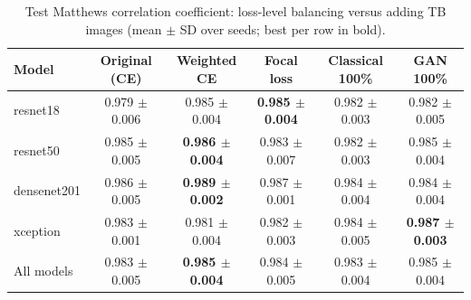 \begin{table}[htbp]
\centering
\caption{Test Matthews correlation coefficient: loss-level balancing versus adding TB images (mean $\pm$ SD over seeds; best per row in bold).}
\label{tab:loss_mcc}
\begin{tabular}{lccccc}
\toprule
Model & Original (CE) & Weighted CE & Focal loss & Classical 100\% & GAN 100\% \\
\midrule
resnet18 & 0.979 $\pm$ 0.006 & 0.985 $\pm$ 0.004 & \textbf{0.985 $\pm$ 0.004} & 0.982 $\pm$ 0.003 & 0.982 $\pm$ 0.005 \\
resnet50 & 0.985 $\pm$ 0.005 & \textbf{0.986 $\pm$ 0.004} & 0.983 $\pm$ 0.007 & 0.982 $\pm$ 0.003 & 0.985 $\pm$ 0.004 \\
densenet201 & 0.986 $\pm$ 0.005 & \textbf{0.989 $\pm$ 0.002} & 0.987 $\pm$ 0.001 & 0.984 $\pm$ 0.004 & 0.984 $\pm$ 0.004 \\
xception & 0.983 $\pm$ 0.001 & 0.981 $\pm$ 0.004 & 0.982 $\pm$ 0.003 & 0.984 $\pm$ 0.005 & \textbf{0.987 $\pm$ 0.003} \\
\midrule
All models & 0.983 $\pm$ 0.005 & \textbf{0.985 $\pm$ 0.004} & 0.984 $\pm$ 0.005 & 0.983 $\pm$ 0.004 & 0.985 $\pm$ 0.004 \\
\bottomrule
\end{tabular}
\end{table}